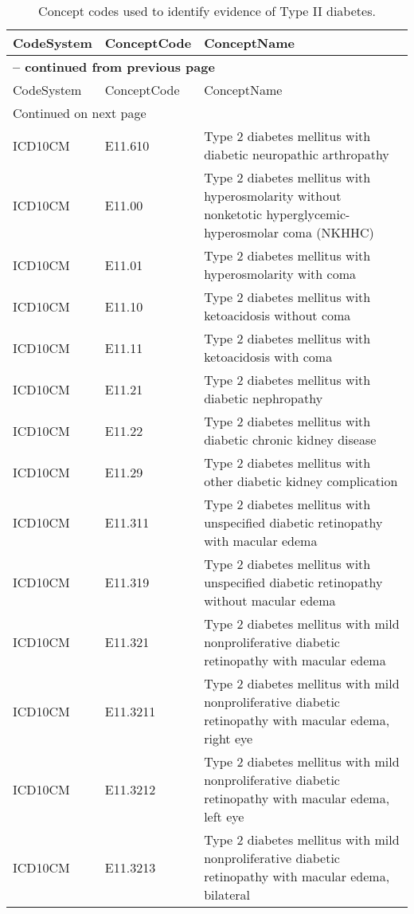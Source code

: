\begin{longtable}{p{}p{}p{}}
\caption{Concept codes used to identify evidence of Type II diabetes.} \\ 
 CodeSystem & ConceptCode & ConceptName \\ 
  \hline 
\endfirsthead 
\multicolumn{3}{p{\textwidth}}{{ \bfseries \tablename \thetable{} -- continued from previous page}} \\ 
\hline CodeSystem & ConceptCode & ConceptName \\ \hline 
\endhead 
\hline \multicolumn{3}{p{\textwidth}}{{Continued on next page}} \\ \hline 
\endfoot 
\hline 
\endlastfoot 
 \hline
ICD10CM & E11.610 & Type 2 diabetes mellitus with diabetic neuropathic arthropathy \\ 
  ICD10CM & E11.00 & Type 2 diabetes mellitus with hyperosmolarity without nonketotic hyperglycemic-hyperosmolar coma (NKHHC) \\ 
  ICD10CM & E11.01 & Type 2 diabetes mellitus with hyperosmolarity with coma \\ 
  ICD10CM & E11.10 & Type 2 diabetes mellitus with ketoacidosis without coma \\ 
  ICD10CM & E11.11 & Type 2 diabetes mellitus with ketoacidosis with coma \\ 
  ICD10CM & E11.21 & Type 2 diabetes mellitus with diabetic nephropathy \\ 
  ICD10CM & E11.22 & Type 2 diabetes mellitus with diabetic chronic kidney disease \\ 
  ICD10CM & E11.29 & Type 2 diabetes mellitus with other diabetic kidney complication \\ 
  ICD10CM & E11.311 & Type 2 diabetes mellitus with unspecified diabetic retinopathy with macular edema \\ 
  ICD10CM & E11.319 & Type 2 diabetes mellitus with unspecified diabetic retinopathy without macular edema \\ 
  ICD10CM & E11.321 & Type 2 diabetes mellitus with mild nonproliferative diabetic retinopathy with macular edema \\ 
  ICD10CM & E11.3211 & Type 2 diabetes mellitus with mild nonproliferative diabetic retinopathy with macular edema, right eye \\ 
  ICD10CM & E11.3212 & Type 2 diabetes mellitus with mild nonproliferative diabetic retinopathy with macular edema, left eye \\ 
  ICD10CM & E11.3213 & Type 2 diabetes mellitus with mild nonproliferative diabetic retinopathy with macular edema, bilateral \\ 

\end{longtable}

